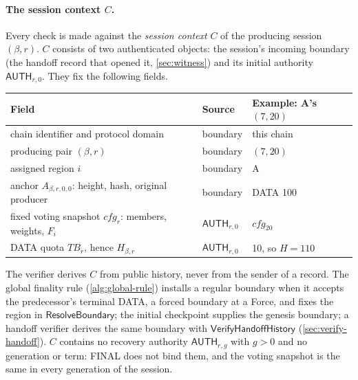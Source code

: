 \documentclass[11pt,a4paper]{article}
\newcommand{\TB}{\mathit{TB}}
\newcommand{\tagg}[1]{\ensuremath{\mathsf{#1}}}
\newcommand{\defterm}[1]{\textcolor{rrBlue}{\textit{#1}}}
\newcounter{protocol}
\begin{document}
\paragraph{The session context $C$.}
Every check is made against the \defterm{session context} $C$ of the
producing session $(\beta,r)$. $C$ consists of two authenticated
objects: the session's incoming boundary (the handoff record that opened
it, \cref{sec:witness}) and its initial authority $\tagg{AUTH}_{r,0}$.
They fix the following fields.
\begin{center}\small
\begin{tabularx}{\linewidth}{@{}>{\raggedright\arraybackslash}p{.36\linewidth}>{\raggedright\arraybackslash}p{.2\linewidth}Y@{}}\toprule
Field & Source & Example: A's $(7,20)$\\\midrule
chain identifier and protocol domain & boundary & this chain\\
producing pair $(\beta,r)$ & boundary & $(7,20)$\\
assigned region $i$ & boundary & A\\
anchor $A_{\beta,r,0,0}$: height, hash, original producer & boundary & DATA 100\\
fixed voting snapshot $\mathit{cfg}_r$: members, weights, $F_i$ & $\tagg{AUTH}_{r,0}$ & $\mathit{cfg}_{20}$\\
DATA quota $\TB_r$, hence $H_{\beta,r}$ & $\tagg{AUTH}_{r,0}$ & 10, so $H=110$\\\bottomrule
\end{tabularx}
\end{center}
The verifier derives $C$ from public history, never from the sender of a
record. The global finality rule (\cref{alg:global-rule}) installs a
regular boundary when it accepts the predecessor's terminal DATA, a
forced boundary at a Force, and fixes the region in
$\tagg{ResolveBoundary}$; the
initial checkpoint supplies the genesis boundary; a handoff verifier
derives the same boundary with $\tagg{VerifyHandoffHistory}$
(\cref{sec:verify-handoff}). $C$ contains no recovery authority
$\tagg{AUTH}_{r,g}$ with $g>0$ and no generation or term: FINAL does not
bind them, and the voting snapshot is the same in every generation of
the session.
\end{document}
